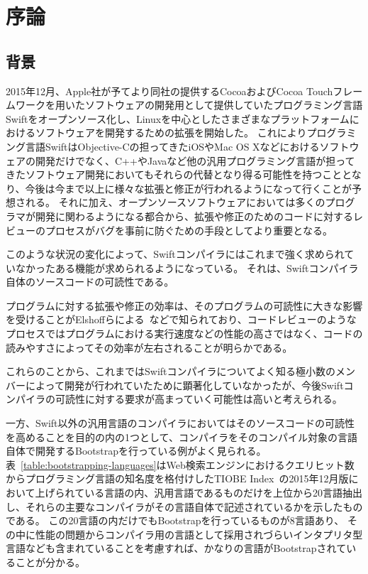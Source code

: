 \chapter{序論}
\label{introduction}

\section{背景}
\label{introduction:background}

2015年12月、Apple社が予てより同社の提供するCocoaおよびCocoa Touchフレームワークを用いたソフトウェアの開発用として提供していたプログラミング言語Swiftをオープンソース化し、Linuxを中心としたさまざまなプラットフォームにおけるソフトウェアを開発するための拡張を開始した。
これによりプログラミング言語SwiftはObjective-Cの担ってきたiOSやMac OS Xなどにおけるソフトウェアの開発だけでなく、C++やJavaなど他の汎用プログラミング言語が担ってきたソフトウェア開発においてもそれらの代替となり得る可能性を持つこととなり、今後は今まで以上に様々な拡張と修正が行われるようになって行くことが予想される。
それに加え、オープンソースソフトウェアにおいては多くのプログラマが開発に関わるようになる都合から、拡張や修正のためのコードに対するレビューのプロセスがバグを事前に防ぐための手段としてより重要となる。

このような状況の変化によって、Swiftコンパイラにはこれまで強く求められていなかったある機能が求められるようになっている。
それは、Swiftコンパイラ自体のソースコードの可読性である。

プログラムに対する拡張や修正の効率は、そのプログラムの可読性に大きな影響を受けることがElshoffらによる~\cite{elshoff}などで知られており、コードレビューのようなプロセスではプログラムにおける実行速度などの性能の高さではなく、コードの読みやすさによってその効率が左右されることが明らかである。

これらのことから、これまではSwiftコンパイラについてよく知る極小数のメンバーによって開発が行われていたために顕著化していなかったが、今後Swiftコンパイラの可読性に対する要求が高まっていく可能性は高いと考えられる。

一方、Swift以外の汎用言語のコンパイラにおいてはそのソースコードの可読性を高めることを目的の内の1つとして、コンパイラをそのコンパイル対象の言語自体で開発するBootstrapを行っている例がよく見られる。
表~\ref{table:bootstrapping-languages}はWeb検索エンジンにおけるクエリヒット数からプログラミング言語の知名度を格付けしたTIOBE Index~\cite{tiobe}の2015年12月版において上げられている言語の内、汎用言語であるものだけを上位から20言語抽出し、それらの主要なコンパイラがその言語自体で記述されているかを示したものである。
この20言語の内だけでもBootstrapを行っているものが8言語あり、 その中に性能の問題からコンパイラ用の言語として採用されづらいインタプリタ型言語なども含まれていることを考慮すれば、かなりの言語がBootstrapされていることが分かる。

